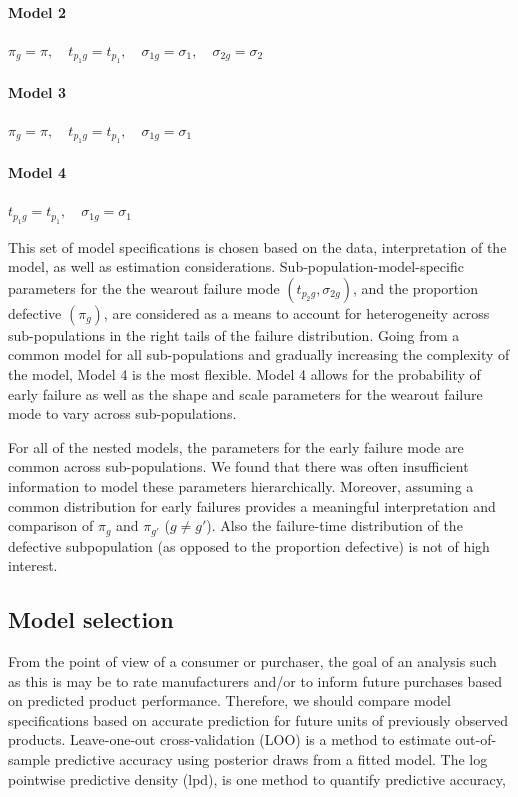 \documentclass[12pt]{article}
\begin{document}
\paragraph{Model 2} $\pi_{g} = \pi,\quad t_{p_{1}g} = t_{p_1},\quad \sigma_{1g}=\sigma_1,\quad \sigma_{2g} = \sigma_2$
\paragraph{Model 3} $\pi_{g} = \pi,\quad  t_{p_{1}g}= t_{p_1},\quad \sigma_{1g}=\sigma_1$
\paragraph{Model 4} $t_{p_{1}g}= t_{p_1},\quad \sigma_{1g}=\sigma_1$


This set of model specifications is chosen based on the data, interpretation of the model, as well as estimation considerations.  Sub-population-model-specific parameters for the the wearout failure mode $(t_{p_{2}g},\sigma_{2g})$, and the proportion defective $(\pi_g)$, are considered as a means to account for heterogeneity across sub-populations in the right tails of the failure distribution.  Going from a common model for all sub-populations and gradually increasing the complexity of the model, Model 4 is the most flexible.  Model 4 allows for the probability of early failure as well as the shape and scale parameters for the wearout failure mode to vary across sub-populations.

For all of the nested models, the parameters for the early failure mode are common across sub-populations.  We found that there was often insufficient information to model these parameters hierarchically.  Moreover, assuming a common distribution for early failures provides a meaningful interpretation and comparison of $\pi_g$ and $\pi_{g'}$ ($g \neq g'$). Also the failure-time distribution of the defective subpopulation (as opposed to the proportion defective) is not of high interest.

\subsection{Model selection}
From the point of view of a consumer or purchaser, the goal of an analysis such as this is may be to rate manufacturers and/or to inform future purchases based on predicted product performance. Therefore, we should compare model specifications based on accurate prediction for future units of previously observed products.  Leave-one-out cross-validation (LOO) is a method to estimate out-of-sample predictive accuracy using
posterior draws from a fitted model.  The log pointwise predictive density (lpd), is one method to quantify predictive accuracy,
\end{document}
